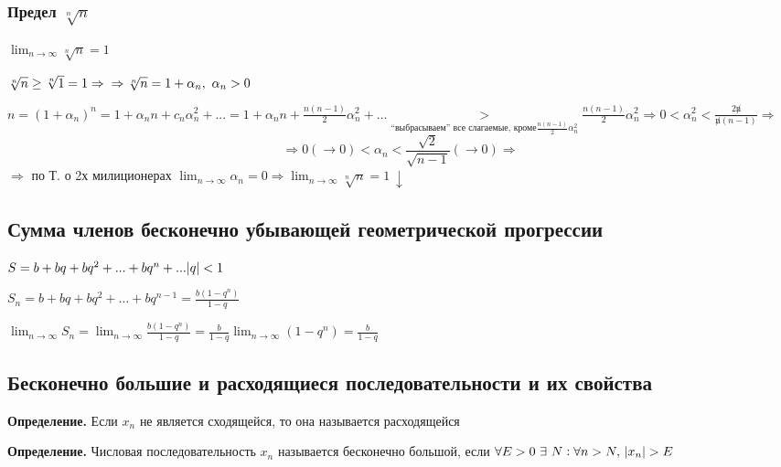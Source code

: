 \documentclass{article}
\begin{document}
    \subsubsection{Предел \(\sqrt[n]{n}\)}
        
        \(\lim_{n \rightarrow \infty}{\sqrt[n]{n}} = 1\)
        
        \(\sqrt[n]{n} \geq \sqrt[n]{1} = 1 \Rightarrow\\
        \Rightarrow \sqrt[n]{n} = 1 + \alpha_n,\ \alpha_n > 0\)
        
        \(n = (1 + \alpha_n)^n = 1 + \alpha_n n + c_n \alpha_n^2 + ... = 1 + \alpha_n n + \frac{n(n-1)}{2} \alpha_n^2 + ...
        \underset{\textrm{``выбрасываем'' все слагаемые, кроме} \frac{n(n-1)}{2} \alpha_n^2} > \frac{n(n-1)}{2} \alpha_n^2 \Rightarrow 0 < \alpha_n^2 < \frac{2 \not n}{\not n (n-1)} \Rightarrow\)
        \[\Rightarrow 0(\rightarrow 0) < \alpha_n < \frac{\sqrt{2}}{\sqrt{n-1}}(\rightarrow 0) \Rightarrow\]
        \(\Rightarrow\) по Т. о 2х милиционерах \(\lim_{n \rightarrow \infty}{\alpha_n} = 0 \Rightarrow \lim_{n \rightarrow \infty}{\sqrt[n]{n}} = 1\ \downarrow\)
    
    
    \subsection{Сумма членов бесконечно убывающей геометрической прогрессии}
    
    \(S = b + b q + b q^2 + ... + b q^n + ...\\
    \abs{q} < 1\)
    
    \(S_n = b + b q + b q^2 + ... + b q^{n-1} = \frac{b(1 - q^n)}{1 - q}\)
    
    \(\lim_{n \rightarrow \infty}{S_n} = \lim_{n \rightarrow \infty}{\frac{b(1 - q^n)}{1 - q}} = \frac{b}{1 - q} \lim_{n \rightarrow \infty}{(1 - q^n)} = \frac{b}{1 - q}\)
    
    \subsection{Бесконечно большие и расходящиеся последовательности и их свойства}
    
    \textbf{Определение.} Если \(x_n\) не является сходящейся, то она называется расходящейся
    
    \textbf{Определение.} Числовая последовательность \(x_n\) называется бесконечно большой, если \(\forall E > 0\ \exists\ N : \forall n > N,\ \abs{x_n} > E\)
    
\end{document}
